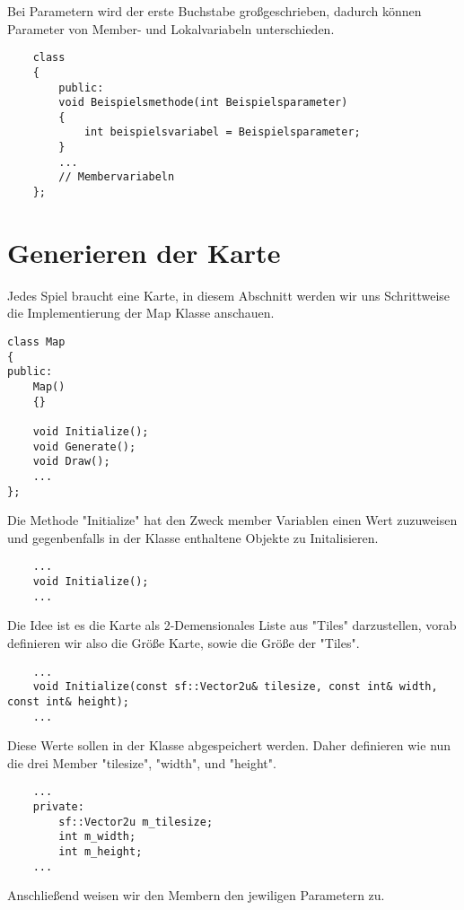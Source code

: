Bei Parametern wird der erste Buchstabe großgeschrieben, dadurch können Parameter von Member- und Lokalvariabeln unterschieden. 
 
\begin{lstlisting}
	class
	{
		public:
		void Beispielsmethode(int Beispielsparameter)
		{
			int beispielsvariabel = Beispielsparameter; 
		}
		...
		// Membervariabeln
	};
\end{lstlisting}



\section{Generieren der Karte}

Jedes Spiel braucht eine Karte, in diesem Abschnitt werden wir uns Schrittweise die Implementierung der Map Klasse anschauen. 

\begin{lstlisting}
class Map
{
public:
	Map()
	{}
	
	void Initialize();
	void Generate();
	void Draw();
	... 
};
\end{lstlisting}

Die Methode "Initialize" hat den Zweck member Variablen einen Wert zuzuweisen und gegenbenfalls in der Klasse enthaltene Objekte zu Initalisieren.
\begin{lstlisting}
	...
	void Initialize();
	...
\end{lstlisting}

Die Idee ist es die Karte als 2-Demensionales Liste aus "Tiles"  darzustellen, vorab definieren wir also die Größe Karte, sowie die Größe der "Tiles". 
\begin{lstlisting}
	...
	void Initialize(const sf::Vector2u& tilesize, const int& width, const int& height);
	...
\end{lstlisting}

Diese Werte sollen in der Klasse abgespeichert werden. Daher definieren wie nun die drei Member "tilesize", "width", und "height". 
\begin{lstlisting}
	...
 	private: 
 		sf::Vector2u m_tilesize; 
 		int m_width; 
 		int m_height; 
	...
\end{lstlisting}

Anschließend weisen wir den Membern den jewiligen Parametern zu. 

